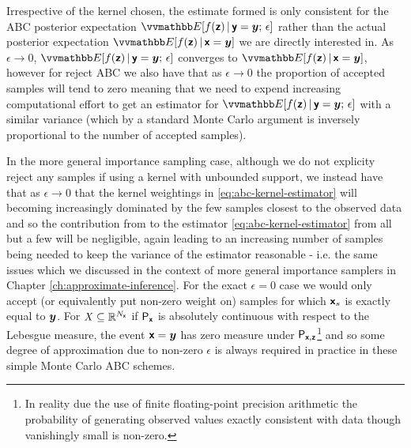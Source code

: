 


Irrespective of the kernel chosen, the estimate formed is only consistent for the \ac{ABC} posterior expectation $\expc{f(\rvct{z}) \gvn \rvct{y} = \vct{y};\,\epsilon}$ rather than the actual posterior expectation $\expc{f(\rvct{z}) \gvn \rvct{x} = \vct{y}}$ we are directly interested in. As $\epsilon \to 0$, $\expc{f(\rvct{z}) \gvn \rvct{y} = \vct{y};\,\epsilon}$ converges to $\expc{f(\rvct{z}) \gvn \rvct{x} = \vct{y}}$, however for reject \ac{ABC} we also have that as $\epsilon \to 0$ the proportion of accepted samples will tend to zero meaning that we need to expend increasing computational effort to get an estimator for $\expc{f(\rvct{z}) \gvn \rvct{y} = \vct{y};\,\epsilon}$ with a similar variance (which by a standard Monte Carlo argument is inversely proportional to the number of accepted samples).

In the more general importance sampling case, although we do not explicity reject any samples if using a kernel with unbounded support, we instead have that as $\epsilon \to 0$ that the kernel weightings in \eqref{eq:abc-kernel-estimator} will becoming increasingly dominated by the few samples closest to the observed data and so the contribution from to the estimator \eqref{eq:abc-kernel-estimator} from all but a few will be negligible, again leading to an increasing number of samples being needed to keep the variance of the estimator reasonable - i.e. the same issues which we discussed in the context of more general importance samplers in Chapter \ref{ch:approximate-inference}. For the exact $\epsilon = 0$ case we would only accept (or equivalently put non-zero weight on) samples for which $\boldsymbol{\mathsf{x}}_s$ is exactly equal to $\boldsymbol{y}$. For $\mathit{X} \subseteq \mathbb{R}^{N_{\boldsymbol{\mathsf{x}}}}$ if $\mathsf{P}_{\boldsymbol{\mathsf{x}}}$ is absolutely continuous with respect to the Lebesgue measure, the event $\boldsymbol{\mathsf{x}} = \boldsymbol{y}$ has zero measure under $\mathsf{P}_{\boldsymbol{\mathsf{x}},\boldsymbol{\mathsf{z}}}$\footnote{In reality due the use of finite floating-point precision arithmetic the probability of generating observed values exactly consistent with data though vanishingly small is non-zero.} and so some degree of approximation due to non-zero $\epsilon$ is always required in practice in these simple Monte Carlo \ac{ABC} schemes.

